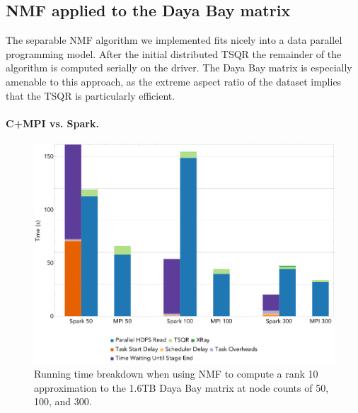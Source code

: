 \subsection{NMF applied to the Daya Bay matrix}
The separable NMF algorithm we implemented fits nicely into a data parallel programming model. After the initial distributed TSQR the remainder of the algorithm is computed serially on the driver. The Daya Bay matrix is especially amenable to this approach, as the extreme aspect ratio of the dataset implies that the TSQR is particularly efficient.

\paragraph{C+MPI vs. Spark.}

\begin{figure}[thb!]
\begin{center}
\includegraphics[width=.9\textwidth]{fig/nmf_run_times.png}
\caption{Running time breakdown when using NMF to compute a rank 10 approximation to the 1.6TB Daya Bay matrix at 
node counts of 50, 100, and 300.}
\label{fig:nmfrt}
\end{center}
\end{figure}

